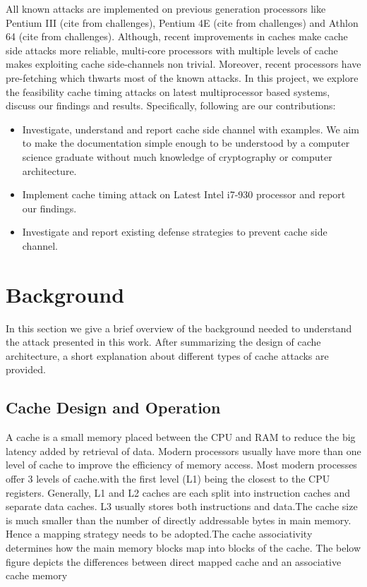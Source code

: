 \documentclass[twocolumn]{IEEEtran}
\begin{document}
All known attacks are implemented on previous generation processors like Pentium III (cite from challenges), Pentium 4E (cite from challenges) and Athlon 64 (cite from challenges). Although, recent improvements in caches make cache side attacks more reliable, multi-core processors with multiple levels of cache makes exploiting cache side-channels non trivial. Moreover, recent processors have pre-fetching\cite{tse1998cpu} which thwarts most of the known attacks. In this project, we explore the feasibility cache timing attacks on latest multiprocessor based systems, discuss our findings and results. Specifically, following are our contributions:
\begin{itemize}
\item Investigate, understand and report cache side channel with examples. We aim to make the documentation simple enough to be understood by a computer science graduate without much knowledge of cryptography or computer architecture.
\item Implement cache timing attack on Latest Intel i7-930 processor and report our findings.
\item Investigate and report existing defense strategies to prevent cache side channel.
\end{itemize}


\section {Background}

In this section we give a brief overview of the background needed to understand the attack presented in this work. After summarizing the design of cache architecture, a short explanation about different types of cache attacks are provided.

\subsection {Cache Design and Operation}

A cache is a small memory placed between the CPU and RAM to reduce the big latency added by retrieval of data. Modern processors usually have more than one level of cache to improve the efficiency of memory access. Most modern processes offer 3 levels of cache.with the first level (L1) being the closest to the CPU registers. Generally, L1 and L2 caches are each split into instruction caches and separate data caches. L3 usually stores both instructions and data.The cache size is much smaller than the number of directly addressable bytes in main memory. Hence a mapping strategy needs to be adopted.The cache associativity determines how the main memory blocks map into blocks of the cache. The below figure depicts the differences between direct mapped cache and an associative cache memory
\end{document}
